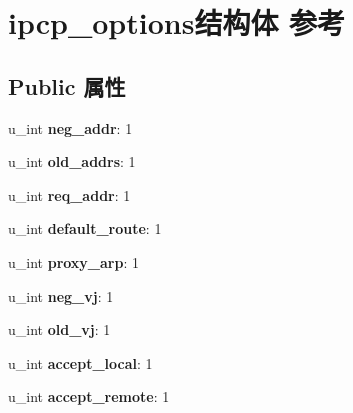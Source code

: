 \hypertarget{structipcp__options}{}\section{ipcp\+\_\+options结构体 参考}
\label{structipcp__options}
\subsection*{Public 属性}
\begin{DoxyCompactItemize}
\item 
\mbox{\label{structipcp__options_a3a51cbb4036696f6c933ec7062d366a1}} 
u\+\_\+int {\bfseries neg\+\_\+addr}\+: 1
\item 
\mbox{\label{structipcp__options_a697d1023d1914e14476775d03c41e7fb}} 
u\+\_\+int {\bfseries old\+\_\+addrs}\+: 1
\item 
\mbox{\label{structipcp__options_a38352fb2365b8551ad61bc16289f1285}} 
u\+\_\+int {\bfseries req\+\_\+addr}\+: 1
\item 
\mbox{\label{structipcp__options_aeb95c954e6eb61857be5417d1f862fc6}} 
u\+\_\+int {\bfseries default\+\_\+route}\+: 1
\item 
\mbox{\label{structipcp__options_af829e166cc2bce5ee8195ed062cdc464}} 
u\+\_\+int {\bfseries proxy\+\_\+arp}\+: 1
\item 
\mbox{\label{structipcp__options_a2ac4c92393cb292cbc3737721c5b27fd}} 
u\+\_\+int {\bfseries neg\+\_\+vj}\+: 1
\item 
\mbox{\label{structipcp__options_ad0e8cedff7502bb8e563a0aa43c41cd5}} 
u\+\_\+int {\bfseries old\+\_\+vj}\+: 1
\item 
\mbox{\label{structipcp__options_a34795eadf0f0824e29ff1eb0dea728af}} 
u\+\_\+int {\bfseries accept\+\_\+local}\+: 1
\item 
\mbox{\label{structipcp__options_a9df032d09f309be47e28a322802a1792}} 
u\+\_\+int {\bfseries accept\+\_\+remote}\+: 1

\end{DoxyCompactItemize}
